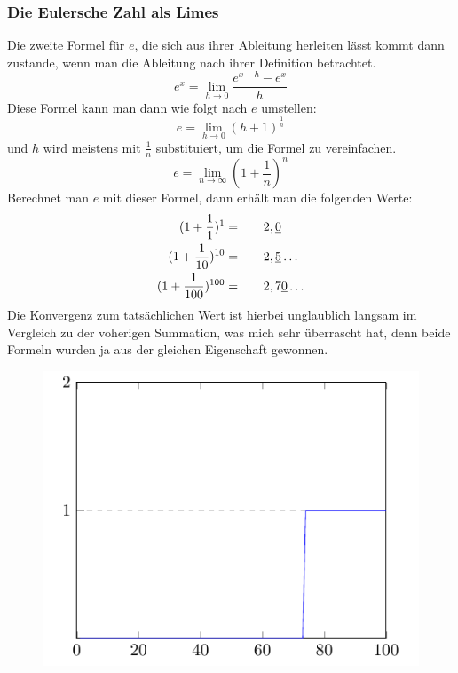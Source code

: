 \subsubsection{Die Eulersche Zahl als Limes}
Die zweite Formel für $e$, die sich aus ihrer Ableitung herleiten lässt kommt dann zustande, wenn man die Ableitung nach ihrer Definition betrachtet. \[
e^x = \lim_{h\to0} \frac{e^{x+h}-e^x}{h}\]
Diese Formel kann man dann wie folgt nach $e$ umstellen:\[
e = \lim_{h\to0} (h + 1)^{\frac{1}{h}}\] 
und $h$ wird meistens mit $\frac{1}{n}$ substituiert, um die Formel zu vereinfachen.\[
e = \lim_{n\to\infty} (1+\frac{1}{n})^n\]
Berechnet man $e$ mit dieser Formel, dann erhält man die folgenden Werte: \[
  \begin{aligned}
  (1+\frac{1}{1})^1 = \indent\crel{2},\underline{0}\\
  (1+\frac{1}{10})^{10} =  \indent\crel{2},\underline{5}\dots\\
  (1+\frac{1}{100})^{100} = \indent\crel{2},7\underline{0}\dots
\end{aligned} \]
Die Konvergenz zum tatsächlichen Wert ist hierbei unglaublich langsam im Vergleich zu der voherigen Summation, was mich sehr überrascht hat, denn beide Formeln wurden ja aus der gleichen Eigenschaft gewonnen.
\begin{figure}[h]
  \includegraphics{medien2/limes/limes.pdf}
  \centering
\end{figure}
